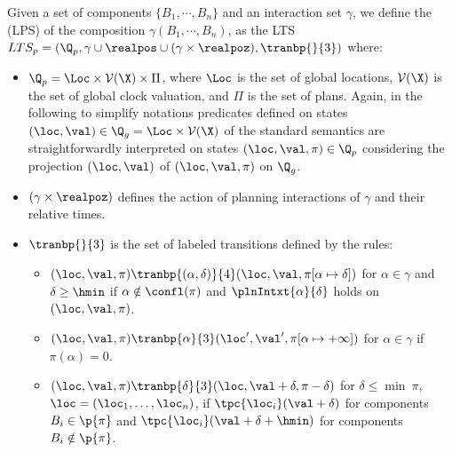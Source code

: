 \begin{definition}\label{def:pln_sem}
Given a set of components $\{B_1,\cdots,B_n\}$ and an interaction set $\gamma$,
we define the \lps (LPS) of the composition $\gamma(B_1,\cdots,B_n)$,
as the LTS $LTS_p=(\Q_p,\gamma\cup\realpos\cup(\gamma\times\realpoz),\tranbp{}{3})$ where:
\begin{itemize}
  \item $\Q_p=\Loc\times\mathcal{V}(\X)\times\Pi$, where $\Loc$ is the set of global locations,
    $\mathcal{V}(\X)$ is the set of global clock valuation, and $\Pi$ is the set of plans.
    Again, in the following to simplify notations predicates defined on states $(\loc,\val) \in \Q_g=\Loc\times\mathcal{V}(\X)$ of the standard semantics are straightforwardly interpreted on states $(\loc,\val,\pi) \in \Q_p$ considering the projection $(\loc,\val)$ of $(\loc,\val,\pi)$ on $\Q_g$.
  \item $(\gamma\times\realpoz)$ defines the action of planning interactions of $\gamma$ and their relative times.
  \item $\tranbp{}{3}$ is the set of labeled transitions defined by the rules:
    \begin{itemize}%
      \item $(\loc,\val,\pi)\tranbp{(\alpha,\delta)}{4}(\loc,\val,\pi [ \alpha\mapsto\delta ])$ for $\alpha \in \gamma$ and $\delta \geq \hmin$ if $\alpha \notin\confl(\pi)$ and $\plnIntxt{\alpha}{\delta}$ holds on $(\loc,\val,\pi)$.

    \item $(\loc,\val,\pi)\tranbp{\alpha}{3}(\loc',\val', \pi [ \alpha\mapsto+\infty ])$ for $\alpha \in \gamma$ if $\pi(\alpha) = 0$.

    \item $(\loc,\val,\pi)\tranbp{\delta}{3}(\loc,\val+\delta,\pi-\delta)$ for $\delta \le \min \ \pi$, $\loc = (\loc_1, \ldots, \loc_n)$, if $\tpc{\loc_i}(\val + \delta)$ for components $B_i \in \p{\pi}$ and $\tpc{\loc_i}(\val + \delta + \hmin)$ for components $B_i \notin \p{\pi}$.
  \end{itemize}
  \end{itemize}
\end{definition}

